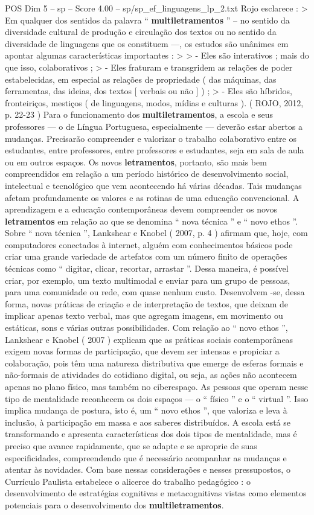 \begin{textsample}{POS Dim 5 – sp – Score 4.00 – sp/sp\_ef\_linguagens\_lp\_2.txt}
Rojo esclarece : > Em qualquer dos sentidos da palavra “ \textbf{multiletramentos} ” – no sentido da diversidade cultural de produção e circulação dos textos ou no sentido da diversidade de linguagens que os constituem —, os estudos são unânimes em apontar algumas características importantes : > > - Eles são interativos ; mais do que isso, colaborativos ; > - Eles fraturam e transgridem as relações de poder estabelecidas, em especial as relações de propriedade ( das máquinas, das ferramentas, das ideias, dos textos [ verbais ou não ] ) ; > - Eles são híbridos, fronteiriços, mestiços ( de linguagens, modos, mídias e culturas ). ( ROJO, 2012, p. 22-23 ) Para o funcionamento dos \textbf{multiletramentos}, a escola e seus professores — o de Língua Portuguesa, especialmente — deverão estar abertos a mudanças.
Precisarão compreender e valorizar o trabalho colaborativo entre os estudantes, entre professores, entre professores e estudantes, seja em sala de aula ou em outros espaços.
Os novos \textbf{letramentos}, portanto, são mais bem compreendidos em relação a um período histórico de desenvolvimento social, intelectual e tecnológico que vem acontecendo há várias décadas.
Tais mudanças afetam profundamente os valores e as rotinas de uma educação convencional.
A aprendizagem e a educação contemporâneas devem compreender os novos \textbf{letramentos} em relação ao que se denomina “ nova técnica ” e “ novo ethos ”.
Sobre “ nova técnica ”, Lankshear e Knobel ( 2007, p. 4 ) afirmam que, hoje, com computadores conectados à internet, alguém com conhecimentos básicos pode criar uma grande variedade de artefatos com um número finito de operações técnicas como “ digitar, clicar, recortar, arrastar ”.
Dessa maneira, é possível criar, por exemplo, um texto multimodal e enviar para um grupo de pessoas, para uma comunidade ou rede, com quase nenhum custo.
Desenvolvem -se, dessa forma, novas práticas de criação e de interpretação de textos, que deixam de implicar apenas texto verbal, mas que agregam imagens, em movimento ou estáticas, sons e várias outras possibilidades.
Com relação ao “ novo ethos ”, Lankshear e Knobel ( 2007 ) explicam que as práticas sociais contemporâneas exigem novas formas de participação, que devem ser intensas e propiciar a colaboração, pois têm uma natureza distributiva que emerge de esferas formais e não-formais de atividades do cotidiano digital, ou seja, as ações não acontecem apenas no plano físico, mas também no ciberespaço.
As pessoas que operam nesse tipo de mentalidade reconhecem os dois espaços — o “ físico ” e o “ virtual ”.
Isso implica mudança de postura, isto é, um “ novo ethos ”, que valoriza e leva à inclusão, à participação em massa e aos saberes distribuídos.
A escola está se transformando e apresenta características dos dois tipos de mentalidade, mas é preciso que avance rapidamente, que se adapte e se aproprie de suas especificidades, compreendendo que é necessário acompanhar as mudanças e atentar às novidades.
Com base nessas considerações e nesses pressupostos, o Currículo Paulista estabelece o alicerce do trabalho pedagógico : o desenvolvimento de estratégias cognitivas e metacognitivas vistas como elementos potenciais para o desenvolvimento dos \textbf{multiletramentos}.


\end{textsample}
